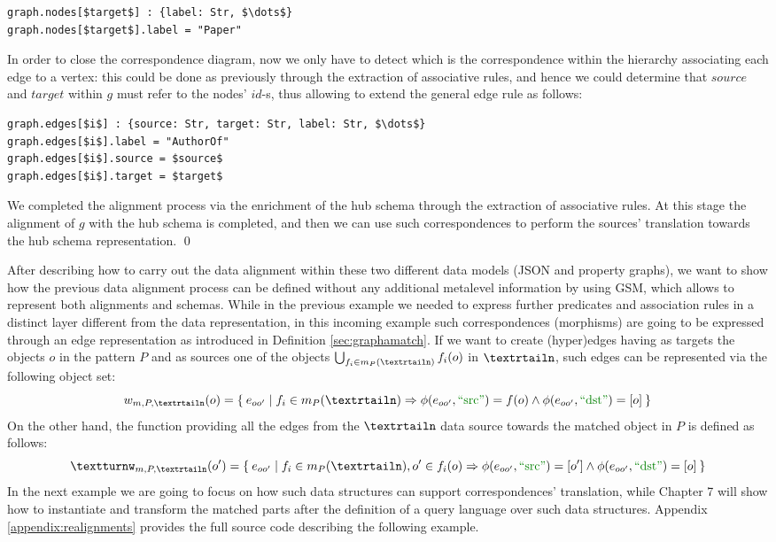 \begin{example}[label=ex:examplegraphdata]
\begin{lstlisting}[language=theoryjson,basicstyle=\ttfamily\small,mathescape=true]
graph.nodes[$target$] : {label: Str, $\dots$}
graph.nodes[$target$].label = "Paper"
\end{lstlisting}
In order to close the correspondence diagram, now we only have to detect which is the correspondence within the hierarchy associating each edge to a vertex: this could be done as previously through the extraction of associative rules, and hence we could determine that $source$ and $target$ within $g$ must refer to the nodes' $id$-s, thus allowing to extend the general edge rule as follows:
\begin{lstlisting}[language=theoryjson,basicstyle=\ttfamily\small,mathescape=true]
graph.edges[$i$] : {source: Str, target: Str, label: Str, $\dots$}
graph.edges[$i$].label = "AuthorOf"
graph.edges[$i$].source = $source$
graph.edges[$i$].target = $target$
\end{lstlisting}
We completed the alignment process via the enrichment of the hub schema through the extraction of associative rules. At this stage the alignment of $g$ with the hub schema is completed, and then we can use such correspondences to perform the sources' translation towards the hub schema representation. \qed
\end{example}
 

After describing how to carry out the data alignment within these two different data models (JSON and property graphs), we want to show how the previous data alignment process can be defined without any additional metalevel information by using GSM, which allows to represent both alignments and schemas. While in the previous example we needed to express further predicates and association rules in a distinct layer different from the data representation, in this incoming example such correspondences (morphisms)  are going to be expressed through an edge representation  as introduced in Definition \vref{sec:graphamatch}. If we want to create (hyper)edges having as targets the objects $o$ in the pattern $P$ and as sources one of the objects $\bigcup_{f_i\in m_P(\nested)}f_i(o)$ in $\nested$, such edges can be represented via the following object set:
\[w_{m,P,\nested}(o)=\Set{e_{oo'}|f_i\in m_P(\nested)\Rightarrow\phi(e_{oo'},\SRC)=f(o)\wedge \phi(e_{oo'},\DST)=[o]}\]
On the other hand, the function providing all the edges from the $\nested$ data source towards the matched object in $P$ is defined as follows:
\[\smatch_{m,P,\nested}(o')=\Set{e_{oo'}|f_i\in m_P(\nested), o'\in f_i(o)\Rightarrow\phi(e_{oo'},\SRC)=[o']\wedge \phi(e_{oo'},\DST)=[o]}\]
In the next example we are going to focus on how such data structures can support  correspondences' translation, while Chapter 7 will show how to instantiate and transform the matched parts after the definition of a query language over such data structures. Appendix \vref{appendix:realignments} provides the full source code describing  the following  example. 

